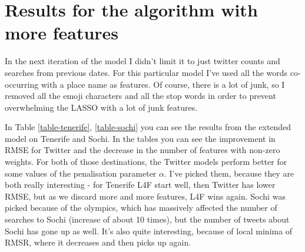 \documentclass[minf,frontabs,twoside,singlespacing,parskip]{infthesis}
\begin{document}

\newpage
\section{Results for the algorithm with more features}
\label{sec:features}

In the next iteration of the model I didn't limit it to just twitter counts and searches from previous dates. For this particular model I've used all the words co-occurring with a place name as features. Of course, there is a lot of junk, so I removed all the emoji characters and all the stop words in order to prevent overwhelming the LASSO with a lot of junk features.

In Table \ref{table-tenerife}, \ref{table-sochi} you can see the results from the extended model on Tenerife and Sochi. In the tables you can see the improvement in RMSE for Twitter and the decrease in the number of features with non-zero weights. For both of those destinations, the Twitter models perform better for some values of the penalisation parameter $\alpha$. I've picked them, because they are both really interesting - for Tenerife L4F start well, then Twitter has lower RMSE, but as we discard more and more features, L4F wins again. Sochi was picked because of the olympics, which has massively affected the number of searches to Sochi (increase of about 10 times), but the number of tweets about Sochi has gone up as well. 
It's also quite interesting, because of local minima of RMSR, where it decreases and then picks up again.
\end{document}
